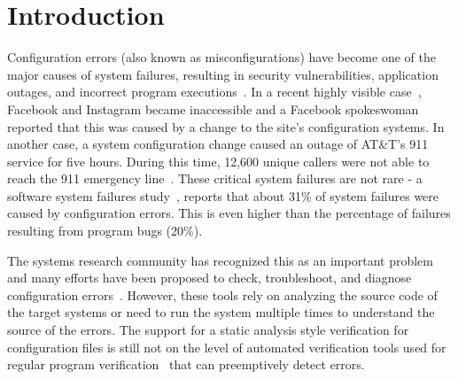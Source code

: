 \section{Introduction}
\label{sec-intro}

Configuration errors (also known as misconfigurations) have become
one of the major causes of system failures, resulting in security vulnerabilities,
application outages, and incorrect program executions~\cite{xu15systems, xu13do, xu15hey}. 
In a recent highly visible case~\cite{mashableNews},  
Facebook and Instagram became inaccessible
and a Facebook spokeswoman reported that 
this was caused by a change to the site's configuration systems.
In another case, a system configuration change caused an outage of AT\&T's 911 service for five hours.
During this time, 12,600 unique callers were not able to reach the 911 emergency line~\cite{att-outage}.
These critical system failures are not rare -
a software system failures study~\cite{yin11anempirical},
reports that about 31\% of system failures were caused by 
configuration errors.
This is even higher than the percentage of failures resulting from program bugs (20\%).

The systems research community has recognized this as an important
problem and many efforts have been proposed to
check, troubleshoot, and diagnose configuration 
errors~\cite{attariyan10automating,
su07autobash, whitaker04configuration,xu16early}.
However, these tools rely on analyzing the source code of 
the target systems or need to run the system
multiple times to understand the source of the errors.
The support for a static analysis style verification for configuration files
is still not on the level of
automated verification tools used for regular program 
verification~\cite{Leino10Dafny, PiskacWZ14, BobotFMP15} that can
preemptively detect errors. 

